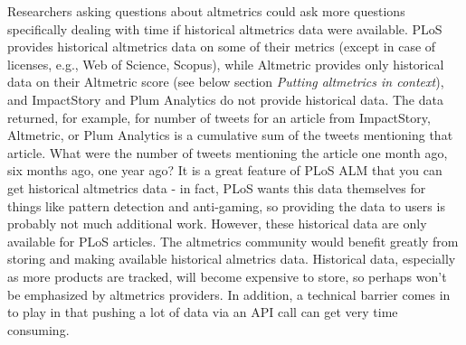 \documentclass[letterpaper,superscriptaddress,showkeys,longbibliography]{revtex4-1}\usepackage{graphicx, color}
\begin{document}
Researchers asking questions about altmetrics could ask more questions specifically dealing with time if historical altmetrics data were available. PLoS provides historical altmetrics data on some of their metrics (except in case of licenses, e.g., Web of Science, Scopus), while Altmetric provides only historical data on their Altmetric score (see below section \emph{Putting altmetrics in context}), and ImpactStory and Plum Analytics do not provide historical data. The data returned, for example, for number of tweets for an article from ImpactStory, Altmetric, or Plum Analytics is a cumulative sum of the tweets mentioning that article. What were the number of tweets mentioning the article one month ago, six months ago, one year ago? It is a great feature of PLoS ALM that you can get historical altmetrics data - in fact, PLoS wants this data themselves for things like pattern detection and anti-gaming, so providing the data to users is probably not much additional work. However, these historical data are only available for PLoS articles. The altmetrics community would benefit greatly from storing and making available historical almetrics data. Historical data, especially as more products are tracked, will become expensive to store, so perhaps won't be emphasized by altmetrics providers. In addition, a technical barrier comes in to play in that pushing a lot of data via an API call can get very time consuming. 


\end{document}
